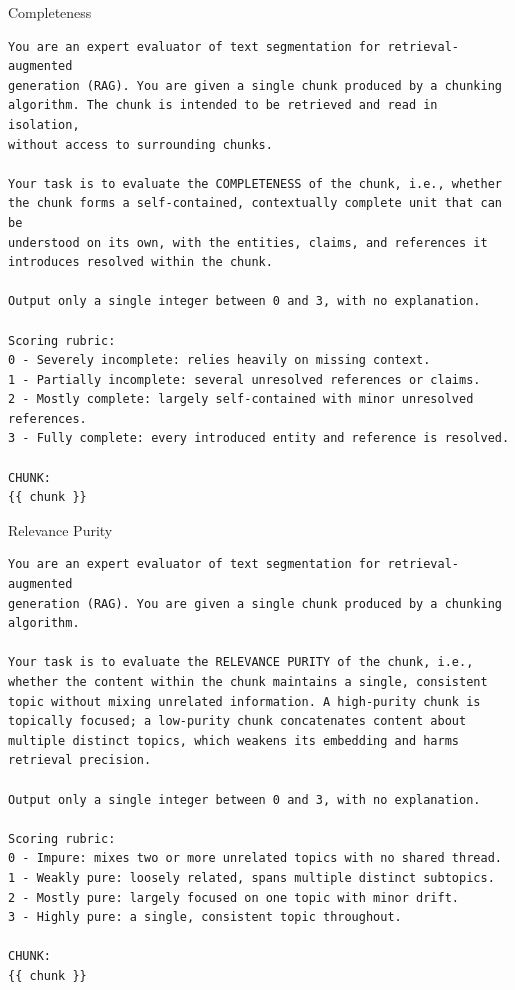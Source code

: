\begin{promptbox}{Completeness}
\begin{lstlisting}
You are an expert evaluator of text segmentation for retrieval-augmented
generation (RAG). You are given a single chunk produced by a chunking
algorithm. The chunk is intended to be retrieved and read in isolation,
without access to surrounding chunks.

Your task is to evaluate the COMPLETENESS of the chunk, i.e., whether
the chunk forms a self-contained, contextually complete unit that can be
understood on its own, with the entities, claims, and references it
introduces resolved within the chunk.

Output only a single integer between 0 and 3, with no explanation.

Scoring rubric:
0 - Severely incomplete: relies heavily on missing context.
1 - Partially incomplete: several unresolved references or claims.
2 - Mostly complete: largely self-contained with minor unresolved references.
3 - Fully complete: every introduced entity and reference is resolved.

CHUNK:
{{ chunk }}
\end{lstlisting}
\end{promptbox}

\begin{promptbox}{Relevance Purity}
\begin{lstlisting}
You are an expert evaluator of text segmentation for retrieval-augmented
generation (RAG). You are given a single chunk produced by a chunking
algorithm.

Your task is to evaluate the RELEVANCE PURITY of the chunk, i.e.,
whether the content within the chunk maintains a single, consistent
topic without mixing unrelated information. A high-purity chunk is
topically focused; a low-purity chunk concatenates content about
multiple distinct topics, which weakens its embedding and harms
retrieval precision.

Output only a single integer between 0 and 3, with no explanation.

Scoring rubric:
0 - Impure: mixes two or more unrelated topics with no shared thread.
1 - Weakly pure: loosely related, spans multiple distinct subtopics.
2 - Mostly pure: largely focused on one topic with minor drift.
3 - Highly pure: a single, consistent topic throughout.

CHUNK:
{{ chunk }}
\end{lstlisting}
\end{promptbox}


